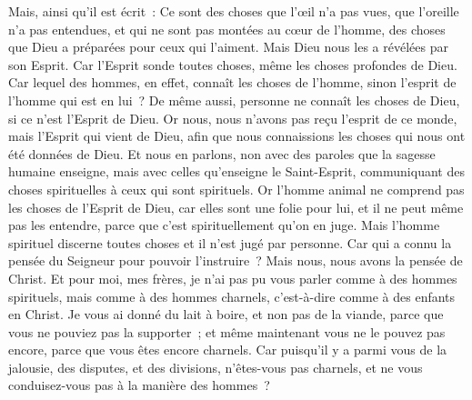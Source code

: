 \begin{multicols}{2}
Mais, ainsi qu'il est écrit~: Ce sont des choses que l'œil n'a pas vues, que l'oreille n'a pas entendues, et qui ne sont pas montées au cœur de l'homme, des choses que Dieu a préparées pour ceux qui l'aiment.
Mais Dieu nous les a révélées par son Esprit. Car l'Esprit sonde toutes choses, même les choses profondes de Dieu.
Car lequel des hommes, en effet, connaît les choses de l'homme, sinon l'esprit de l'homme qui est en lui~? De même aussi, personne ne connaît les choses de Dieu, si ce n'est l'Esprit de Dieu.
Or nous, nous n'avons pas reçu l'esprit de ce monde, mais l'Esprit qui vient de Dieu, afin que nous connaissions les choses qui nous ont été données de Dieu.
Et nous en parlons, non avec des paroles que la sagesse humaine enseigne, mais avec celles qu'enseigne le Saint-Esprit, communiquant des choses spirituelles à ceux qui sont spirituels.
Or l'homme animal ne comprend pas les choses de l'Esprit de Dieu, car elles sont une folie pour lui, et il ne peut même pas les entendre, parce que c'est spirituellement qu'on en juge.
Mais l'homme spirituel discerne toutes choses et il n'est jugé par personne.
Car qui a connu la pensée du Seigneur pour pouvoir l'instruire~? Mais nous, nous avons la pensée de Christ.
\VerseOne{}Et pour moi, mes frères, je n'ai pas pu vous parler comme à des hommes spirituels, mais comme à des hommes charnels, c'est-à-dire comme à des enfants en Christ.
Je vous ai donné du lait à boire, et non pas de la viande, parce que vous ne pouviez pas la supporter~; et même maintenant vous ne le pouvez pas encore, parce que vous êtes encore charnels.
Car puisqu'il y a parmi vous de la jalousie, des disputes, et des divisions, n'êtes-vous pas charnels, et ne vous conduisez-vous pas à la manière des hommes~?

\end{multicols}
